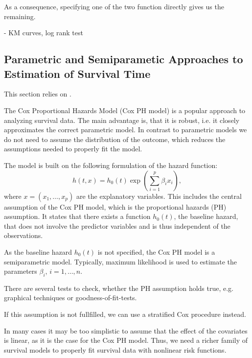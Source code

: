 \documentclass[12pt, a4paper]{article}
\theoremstyle{definition}
\theoremstyle{plain}
\numberwithin{equation}{section}
\numberwithin{figure}{section}
\numberwithin{table}{section}
\begin{document}
	As a consequence, specifying one of the two function directly gives us the remaining.
	
	- KM curves, log rank test
	
	
	\subsection{Parametric and Semiparametic Approaches to Estimation of Survival Time} \label{cox}

	This section relies on \citet*{sabook}.
	
	
	The Cox Proportional Hazards Model (Cox PH model) is a popular approach to analyzing survival data.
	The main advantage is, that it is robust, i.e. it closely approximates the correct parametric model.
	In contrast to parametric models we do not need to assume the distribution of the outcome, which reduces the assumptions needed to properly fit the model.
	
	The model is built on the following formulation of the hazard function:
	\begin{equation*}
	h(t,x) = h_0(t) \exp \left(\sum_{i=1}^p \beta_i x_i\right),
	\end{equation*}
	where $x=(x_1,\dots,x_p)$ are the explanatory variables.
	This includes the central assumption of the Cox PH model, which is the proportional hazards (PH) assumption.
	It states that there exists a function $h_0(t)$, the baseline hazard, that does not involve the predictor variables and is thus independent of the observations.
	
	As the baseline hazard $h_0(t)$ is not specified, the Cox PH model is a semiparametric model.
	Typically, maximum likelihood is used to estimate the parameters $\beta_i$, $i=1,\dots ,n$.
	
	There are several tests to check, whether the PH assumption holds true, e.g. graphical techniques or goodness-of-fit-tests.
	
	
	If this assumption is not fullfilled, we can use a stratified Cox procedure instead.
	
	
	In many cases it may be too simplistic to assume that the effect of the covariates is linear, as it is the case for the Cox PH model.
	Thus, we need a richer family of survival models to properly fit survival data with nonlinear risk functions.
	
\end{document}
